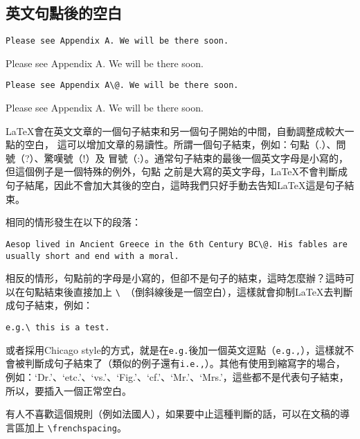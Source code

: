 \subsection{英文句點後的空白}

\begin{Wrong}
\begin{verbatim}
Please see Appendix A. We will be there soon.
\end{verbatim}
Please see Appendix A. We will be there soon.
\end{Wrong}

\begin{Right}
\begin{verbatim}
Please see Appendix A\@. We will be there soon.
\end{verbatim}
Please see Appendix A\@. We will be there soon.
\end{Right}

\LaTeX 會在英文文章的一個句子結束和另一個句子開始的中間，自動調整成較大一點的空白，
這可以增加文章的易讀性。所謂一個句子結束，例如：句點（.）、問號（?）、驚嘆號（!）及
冒號（:）。通常句子結束的最後一個英文字母是小寫的，但這個例子是一個特殊的例外，句點
之前是大寫的英文字母，\LaTeX 不會判斷成句子結尾，因此不會加大其後的空白，這時我們只好手動去告知\LaTeX 這是句子結束。

相同的情形發生在以下的段落：

\begin{Code}
\small
{}
\begin{verbatim}
Aesop lived in Ancient Greece in the 6th Century BC\@. His fables are
usually short and end with a moral.
\end{verbatim}
\end{Code}

相反的情形，句點前的字母是小寫的，但卻不是句子的結束，這時怎麼辦？這時可以在句點結束後直接加上 \verb|\ |（倒斜線後是一個空白），這樣就會抑制\LaTeX 去判斷成句子結束，例如：

\begin{Code}
\small
\begin{verbatim}
e.g.\ this is a test.
\end{verbatim}
\end{Code}

或者採用Chicago style的方式，就是在{\tt e.g.}後加一個英文逗點（{\tt e.g.,}），這樣就不會被判斷成句子結束了（類似的例子還有{\tt i.e.,}）。其他有使用到縮寫字的場合，例如：`Dr.'、`etc.'、`vs.'、`Fig.'、`cf.'、`Mr.'、`Mrs.'，這些都不是代表句子結束，所以，要插入一個正常空白。

有人不喜歡這個規則（例如法國人），如果要中止這種判斷的話，可以在文稿的導言區加上 \verb|\frenchspacing|。

\marginpar{\back}
